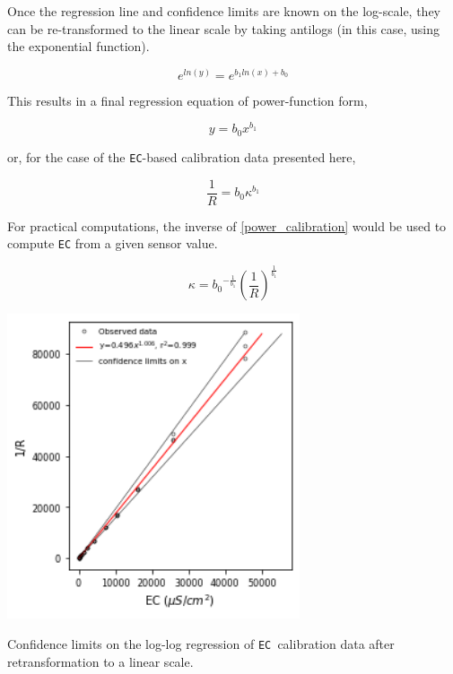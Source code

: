 Once the regression line and confidence limits are known on the log-scale, they can be re-transformed to the linear scale by taking antilogs (in this case, using the exponential function). 

\begin{equation}
	e^{ln(y)} = e^{b_1 ln(x) + b_0}
\end{equation}

This results in a final regression equation of power-function form,

\begin{equation}
	y = b_0 x^{b_1}
\end{equation}

or, for the case of the \texttt{EC}-based calibration data presented here,

\begin{equation}\label{power_calibration}
	\frac{1}{R} = b_0 \kappa^{b_1}
\end{equation}

For practical computations, the inverse of \ref{power_calibration} would be used to compute \texttt{EC} from a given sensor value.

\begin{equation}\label{power_calibration}
	\kappa = {b_0}^{-\frac{1}{b_1}}\left ( \frac{1}{R}\right )^{\frac{1}{b_1}} 
\end{equation}

\begin{marginfigure}[0cm]
	\begin{center}
		\includegraphics[height=9cm]{Images/log_confidence_retransformed.png}
		\caption[Confidence Limits on Retransformed Log-Log Regression]{Confidence limits on the log-log regression of \texttt{EC }calibration data after retransformation to a linear scale.}
	\end{center}
\end{marginfigure}

